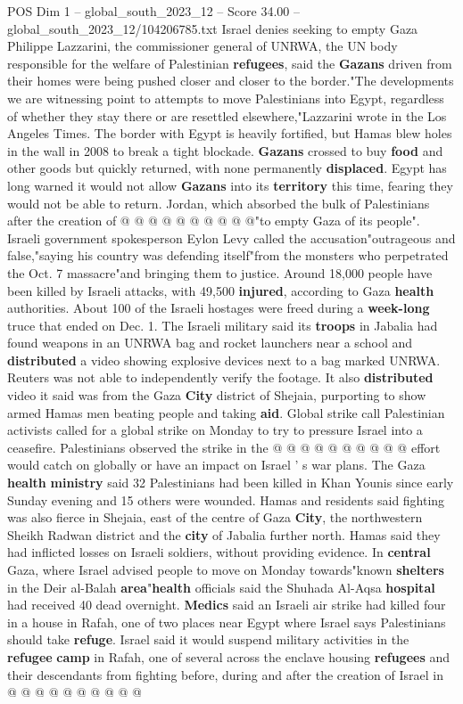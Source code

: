 \begin{textsample}{POS Dim 1 – global\_south\_2023\_12 – Score 34.00 – global\_south\_2023\_12/104206785.txt}
Israel denies seeking to empty Gaza Philippe Lazzarini, the commissioner general of UNRWA, the UN body responsible for the welfare of Palestinian \textbf{refugees}, said the \textbf{Gazans} driven from their homes were being pushed closer and closer to the border."The developments we are witnessing point to attempts to move Palestinians into Egypt, regardless of whether they stay there or are resettled elsewhere,"Lazzarini wrote in the Los Angeles Times.
The border with Egypt is heavily fortified, but Hamas blew holes in the wall in 2008 to break a tight blockade. \textbf{Gazans} crossed to buy \textbf{food} and other goods but quickly returned, with none permanently \textbf{displaced}.
Egypt has long warned it would not allow \textbf{Gazans} into its \textbf{territory} this time, fearing they would not be able to return.
Jordan, which absorbed the bulk of Palestinians after the creation of @ @ @ @ @ @ @ @ @ @"to empty Gaza of its people".
Israeli government spokesperson Eylon Levy called the accusation"outrageous and false,"saying his country was defending itself"from the monsters who perpetrated the Oct. 7 massacre"and bringing them to justice.
Around 18,000 people have been killed by Israeli attacks, with 49,500 \textbf{injured}, according to Gaza \textbf{health} authorities.
About 100 of the Israeli hostages were freed during a \textbf{week-long} truce that ended on Dec. 1.
The Israeli military said its \textbf{troops} in Jabalia had found weapons in an UNRWA bag and rocket launchers near a school and \textbf{distributed} a video showing explosive devices next to a bag marked UNRWA.
Reuters was not able to independently verify the footage.
It also \textbf{distributed} video it said was from the Gaza \textbf{City} district of Shejaia, purporting to show armed Hamas men beating people and taking \textbf{aid}.
Global strike call Palestinian activists called for a global strike on Monday to try to pressure Israel into a ceasefire.
Palestinians observed the strike in the @ @ @ @ @ @ @ @ @ @ effort would catch on globally or have an impact on Israel ' s war plans.
The Gaza \textbf{health} \textbf{ministry} said 32 Palestinians had been killed in Khan Younis since early Sunday evening and 15 others were wounded.
Hamas and residents said fighting was also fierce in Shejaia, east of the centre of Gaza \textbf{City}, the northwestern Sheikh Radwan district and the \textbf{city} of Jabalia further north.
Hamas said they had inflicted losses on Israeli soldiers, without providing evidence.
In \textbf{central} Gaza, where Israel advised people to move on Monday towards"known \textbf{shelters} in the Deir al-Balah \textbf{area}"\textbf{health} officials said the Shuhada Al-Aqsa \textbf{hospital} had received 40 dead overnight. \textbf{Medics} said an Israeli air strike had killed four in a house in Rafah, one of two places near Egypt where Israel says Palestinians should take \textbf{refuge}.
Israel said it would suspend military activities in the \textbf{refugee} \textbf{camp} in Rafah, one of several across the enclave housing \textbf{refugees} and their descendants from fighting before, during and after the creation of Israel in @ @ @ @ @ @ @ @ @ @


\end{textsample}
